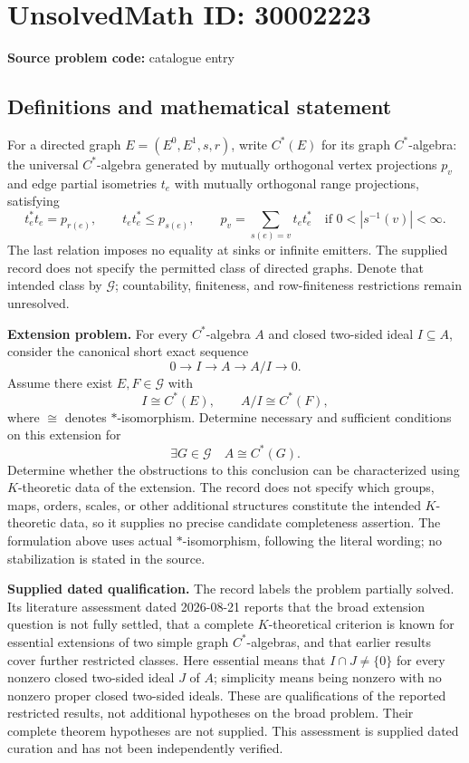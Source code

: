 \documentclass[11pt]{article}
\begin{document}
\section*{UnsolvedMath ID: 30002223}
\textbf{Source problem code:} catalogue entry
\subsection{Definitions and mathematical statement}
For a directed graph \(E=(E^0,E^1,s,r)\), write \(C^*(E)\) for its graph \(C^*\)-algebra: the universal \(C^*\)-algebra generated by mutually orthogonal vertex projections \(p_v\) and edge partial isometries \(t_e\) with mutually orthogonal range projections, satisfying
\[
 t_e^*t_e=p_{r(e)},\qquad t_et_e^*\leq p_{s(e)},\qquad
 p_v=\sum_{s(e)=v}t_et_e^*\quad\text{if }0<|s^{-1}(v)|<\infty.
\]
The last relation imposes no equality at sinks or infinite emitters. The supplied record does not specify the permitted class of directed graphs. Denote that intended class by \(\mathcal G\); countability, finiteness, and row-finiteness restrictions remain unresolved.

\textbf{Extension problem.} For every \(C^*\)-algebra \(A\) and closed two-sided ideal \(I\subseteq A\), consider the canonical short exact sequence
\[
0\longrightarrow I\longrightarrow A\longrightarrow A/I\longrightarrow0.
\]
Assume there exist \(E,F\in\mathcal G\) with
\[
I\cong C^*(E),\qquad A/I\cong C^*(F),
\]
where \(\cong\) denotes \(*\)-isomorphism. Determine necessary and sufficient conditions on this extension for
\[
\exists G\in\mathcal G\quad A\cong C^*(G).
\]
Determine whether the obstructions to this conclusion can be characterized using \(K\)-theoretic data of the extension. The record does not specify which groups, maps, orders, scales, or other additional structures constitute the intended \(K\)-theoretic data, so it supplies no precise candidate completeness assertion. The formulation above uses actual \(*\)-isomorphism, following the literal wording; no stabilization is stated in the source.

\textbf{Supplied dated qualification.} The record labels the problem partially solved. Its literature assessment dated 2026-08-21 reports that the broad extension question is not fully settled, that a complete \(K\)-theoretical criterion is known for essential extensions of two simple graph \(C^*\)-algebras, and that earlier results cover further restricted classes. Here essential means that \(I\cap J\neq\{0\}\) for every nonzero closed two-sided ideal \(J\) of \(A\); simplicity means being nonzero with no nonzero proper closed two-sided ideals. These are qualifications of the reported restricted results, not additional hypotheses on the broad problem. Their complete theorem hypotheses are not supplied. This assessment is supplied dated curation and has not been independently verified.
\end{document}
